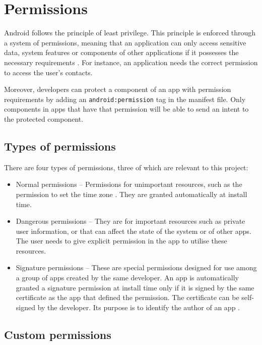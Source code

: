     \section{Permissions}
        \label{sec:permissions}
        
    Android follows the principle of least privilege. This principle is enforced through a system of permissions, meaning that an application can only access sensitive data, system features or components of other applications if it possesses the necessary requirements \cite{permissions_guide}. For instance, an application needs the correct permission to access the user’s contacts. 
    
    Moreover, developers can protect a component of an app with permission requirements by adding an \lstinline|android:permission| tag in the manifest file. Only components in apps that have that permission will be able to send an intent to the protected component.
    
    \subsection{Types of permissions}
        \label{subsec:types_of_permissions}
        
    There are four types of permissions, three of which are relevant to this project:
    
    \begin{itemize}
        \item Normal permissions – Permissions for unimportant resources, such as the permission to set the time zone \cite{permissions_guide}. They are granted automatically at install time.
        \item Dangerous permissions – They are for important resources such as private user information, or that can affect the state of the system or of other apps. The user needs to give explicit permission in the app to utilise these resources.
        \item Signature permissions – These are special permissions designed for use among a group of apps created by the same developer. An app is automatically granted a signature permission at install time only if it is signed by the same certificate as the app that defined the permission. The certificate can be self-signed by the developer. Its purpose is to identify the author of an app \cite{define_custom_permission}.
    \end{itemize}
    
    \subsection{Custom permissions}
        \label{subsec:custom_permissions}
        
